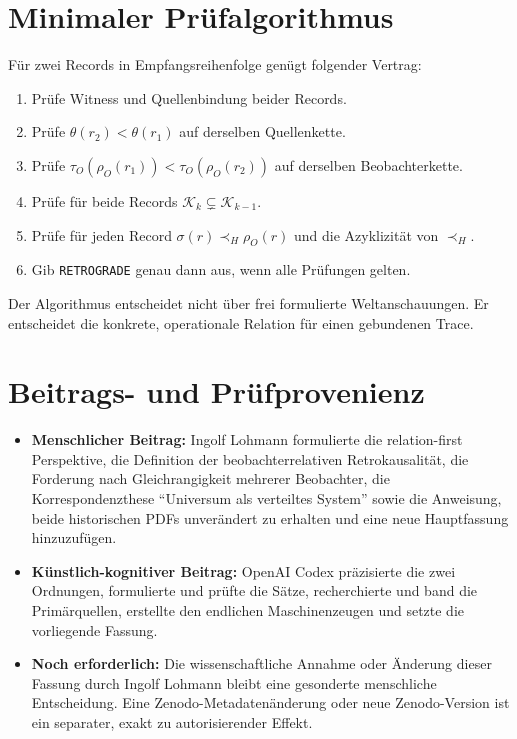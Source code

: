 \documentclass[11pt,a4paper]{article}
\theoremstyle{remark}
\newcommand{\host}{\prec_{\!H}}
\newcommand{\histories}{\mathcal{K}}
\begin{document}
\appendix
\section{Minimaler Prüfalgorithmus}

Für zwei Records in Empfangsreihenfolge genügt folgender Vertrag:

\begin{enumerate}
  \item Prüfe Witness und Quellenbindung beider Records.
  \item Prüfe \(\theta(r_2)<\theta(r_1)\) auf derselben Quellenkette.
  \item Prüfe
  \(\tau_O(\rho_O(r_1))<\tau_O(\rho_O(r_2))\) auf derselben
  Beobachterkette.
  \item Prüfe für beide Records
  \(\histories_k\subsetneq\histories_{k-1}\).
  \item Prüfe für jeden Record
  \(\sigma(r)\host\rho_O(r)\) und die Azyklizität von \(\host\).
  \item Gib \texttt{RETROGRADE} genau dann aus, wenn alle Prüfungen gelten.
\end{enumerate}

Der Algorithmus entscheidet nicht über frei formulierte Weltanschauungen. Er
entscheidet die konkrete, operationale Relation für einen gebundenen Trace.

\section{Beitrags- und Prüfprovenienz}

\begin{itemize}
  \item \textbf{Menschlicher Beitrag:} Ingolf Lohmann formulierte die
  relation-first Perspektive, die Definition der beobachterrelativen
  Retrokausalität, die Forderung nach Gleichrangigkeit mehrerer Beobachter,
  die Korrespondenzthese ``Universum als verteiltes System'' sowie die
  Anweisung, beide historischen PDFs unverändert zu erhalten und eine neue
  Hauptfassung hinzuzufügen.
  \item \textbf{Künstlich-kognitiver Beitrag:} OpenAI Codex präzisierte die
  zwei Ordnungen, formulierte und prüfte die Sätze, recherchierte und band die
  Primärquellen, erstellte den endlichen Maschinenzeugen und setzte die
  vorliegende Fassung.
  \item \textbf{Noch erforderlich:} Die wissenschaftliche Annahme oder
  Änderung dieser Fassung durch Ingolf Lohmann bleibt eine gesonderte
  menschliche Entscheidung. Eine Zenodo-Metadatenänderung oder neue
  Zenodo-Version ist ein separater, exakt zu autorisierender Effekt.
\end{itemize}
\end{document}
